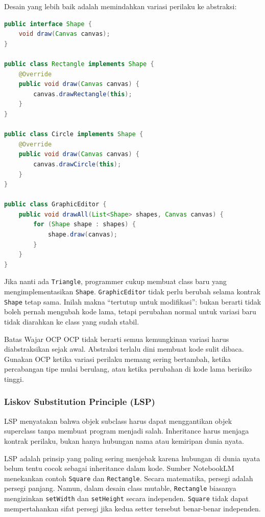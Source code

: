 Desain yang lebih baik adalah memindahkan variasi perilaku ke abstraksi:

\begin{lstlisting}[language=Java, caption={Penerapan OCP: variasi perilaku lewat polymorphism}, label={lst:ocp-good}]
public interface Shape {
    void draw(Canvas canvas);
}

public class Rectangle implements Shape {
    @Override
    public void draw(Canvas canvas) {
        canvas.drawRectangle(this);
    }
}

public class Circle implements Shape {
    @Override
    public void draw(Canvas canvas) {
        canvas.drawCircle(this);
    }
}

public class GraphicEditor {
    public void drawAll(List<Shape> shapes, Canvas canvas) {
        for (Shape shape : shapes) {
            shape.draw(canvas);
        }
    }
}
\end{lstlisting}

Jika nanti ada \texttt{Triangle}, programmer cukup membuat class baru yang mengimplementasikan \texttt{Shape}. \texttt{GraphicEditor} tidak perlu berubah selama kontrak \texttt{Shape} tetap sama. Inilah makna ``tertutup untuk modifikasi'': bukan berarti tidak boleh pernah mengubah kode lama, tetapi perubahan normal untuk variasi baru tidak diarahkan ke class yang sudah stabil.

\begin{cmt}{Batas Wajar OCP}{}
OCP tidak berarti semua kemungkinan variasi harus diabstraksikan sejak awal. Abstraksi terlalu dini membuat kode sulit dibaca. Gunakan OCP ketika variasi perilaku memang sering bertambah, ketika percabangan tipe mulai berulang, atau ketika perubahan di kode lama berisiko tinggi.
\end{cmt}

\subsubsection{Liskov Substitution Principle (LSP)}

\begin{jawab}
LSP menyatakan bahwa objek subclass harus dapat menggantikan objek superclass tanpa membuat program menjadi salah. Inheritance harus menjaga kontrak perilaku, bukan hanya hubungan nama atau kemiripan dunia nyata.
\end{jawab}

LSP adalah prinsip yang paling sering menjebak karena hubungan di dunia nyata belum tentu cocok sebagai inheritance dalam kode. Sumber NotebookLM menekankan contoh \texttt{Square} dan \texttt{Rectangle}. Secara matematika, persegi adalah persegi panjang. Namun, dalam desain class mutable, \texttt{Rectangle} biasanya mengizinkan \texttt{setWidth} dan \texttt{setHeight} secara independen. \texttt{Square} tidak dapat mempertahankan sifat persegi jika kedua setter tersebut benar-benar independen.

